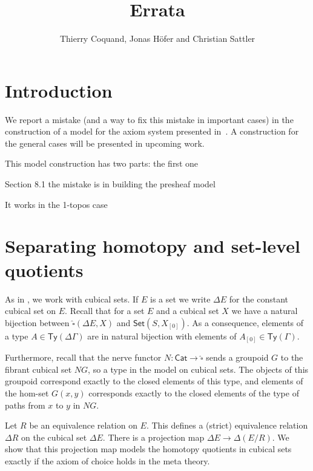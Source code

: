 \documentclass[10pt,a4paper]{article}
\newcommand{\Cat}{\mathsf{Cat}}
\newcommand{\Set}{\mathsf{Set}}
\newcommand\Ty{\mathsf{Ty}}
\begin{document}
\title{Errata}

\author{Thierry Coquand, Jonas H\"ofer and Christian Sattler}
\date{}
\maketitle


\section*{Introduction}

We report a mistake (and a way to fix this mistake in important cases) in the construction of a model for the axiom system presented in~\cite{draft}.
A construction for the general cases will be presented in upcoming work.

This model construction has two parts: the first one

Section 8.1 the mistake is in building the presheaf model

It works in the 1-topos case

\section{Separating homotopy and set-level quotients}

As in \cite{draft}, we work with cubical sets.
If $E$ is a set we write $\Delta E$ for the constant cubical set on $E$.
Recall that for a set $E$ and a cubical set $X$ we have a natural bijection between $\widehat{\square}(\Delta E, X)$ and $\Set(S, X_{[0]})$.
As a consequence, elements of a type $A \in \Ty(\Delta\Gamma)$ are in natural bijection with elements of $A_{[0]} \in \Ty(\Gamma)$.

Furthermore, recall that the nerve functor $N \colon \Cat \to \widehat{\square}$ sends a groupoid $G$ to the fibrant cubical set $NG$, so a type in the model on cubical sets.
The objects of this groupoid correspond exactly to the closed elements of this type, and elements of the hom-set $G(x, y)$ corresponds exactly to the closed elements of the type of paths from $x$ to $y$ in $NG$.

Let $R$ be an equivalence relation on $E$.
This defines a (strict) equivalence relation $\Delta R$ on the cubical set $\Delta E$.
There is a projection map $\Delta E \rightarrow \Delta (E/R)$.
We show that this projection map models the homotopy quotients in cubical sets exactly if the axiom of choice holds in the meta theory.
\end{document}
